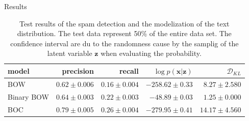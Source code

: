 \documentclass{beamer}
\newcommand{\kldiv}{\mathcal{D}_{KL}}
\begin{document}
\begin{frame}{Results}
\begin{table}[h]
	\caption{Test results of the spam detection and the modelization of the text distribution. The test data represent 50\% of the entire data set. The confidence interval are du to the randomness cause by the samplig of the latent variable $\mathbf{z}$ when evaluating the probability.}
	\centering
	\begin{adjustbox}{max width=\textwidth}
		\begin{tabular}{lrrrr}
			\toprule
			model & precision &  recall & $\log p(\mathbf{x}|\mathbf{z})$ & $\kldiv$\\
			\midrule
			BOW &  $0.62\pm 0.006$ &$0.16\pm 0.004$ & $-258.62\pm 0.33$ & $8.27\pm 2.580$\\
			Binary BOW & $0.64\pm 0.003$ & $0.22\pm 0.003$ & $-48.89\pm 0.03$ & $1.25\pm 0.000$\\
			BOC & $0.79\pm0.005$ & $0.26\pm 0.004$ & $-279.95\pm 0.41$ & $14.17\pm 4.560$ \\
			\bottomrule
		\end{tabular}
	\end{adjustbox}
	\label{table:result}
\end{table}
\end{frame}
\end{document}
